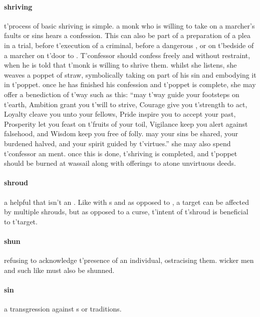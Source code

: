 \paragraph{shriving} t'\allowbreak process of basic shriving is simple. a monk who is willing to take on a marcher’s faults or sins hears a confession. This can also be part of a preparation of a  plea in a trial, before t'\allowbreak execution of a criminal, before a dangerous , or on t'\allowbreak bedside of a marcher on t'\allowbreak door to . T'confessor should confess freely and without restraint, when he is told that t'\allowbreak monk is willing to shrive them. whilst she listens, she weaves a poppet of straw, symbolically taking on part of his sin and embodying it in t'\allowbreak poppet. once he has finished his confession and t'\allowbreak poppet is complete, she may offer a benediction of t'\allowbreak way such as this: “may t'\allowbreak way guide your footsteps on t'\allowbreak earth, Ambition grant you t'\allowbreak will to strive, Courage give you t'\allowbreak strength to act, Loyalty cleave you unto your fellows, Pride inspire you to accept your past, Prosperity let you feast on t'\allowbreak fruits of your toil, Vigilance keep you alert against falsehood, and Wisdom keep you free of folly. may your sins be shared, your burdened halved, and your spirit guided by t'\allowbreak virtues.” she may also spend t'\allowbreak confessor an ment. once this is done, t'\allowbreak shriving is completed, and t'\allowbreak poppet should be burned at wassail along with offerings to atone unvirtuous deeds.
\paragraph{shroud} a helpful  that isn't an . Like with s and as opposed to , a target can be affected by multiple shrouds, but as opposed to a curse, t'\allowbreak intent of t'\allowbreak shroud is beneficial to t'\allowbreak target.
\paragraph{shun} refusing to acknowledge t'\allowbreak presence of an individual, ostracising them. wicker men and such like must also be shunned. 
\paragraph{sin} a transgression against s or traditions. 
